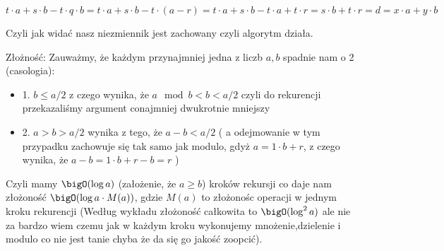 $$t \cdot a + s \cdot b - t \cdot q \cdot b = t\cdot a + s\cdot b - t\cdot(a - r) =  t\cdot a + s \cdot b - t \cdot a + t\cdot r = s \cdot b + t \cdot r = d = x\cdot a + y \cdot b$$

Czyli jak widać nasz niezmiennik jest zachowany czyli algorytm działa. \newline

Złożność:
Zauważmy, że każdym przynajmniej jedna z liczb $a,b$ spadnie nam o 2 (casologia):
\begin{itemize}
    \item 1. $b \leq a/2$ z czego wynika, że $a\mod b < b < a/2$ czyli do rekurencji przekazaliśmy argument conajmniej dwukrotnie mniejszy
    
    \item 2. $a > b > a/2$ wynika z tego, że $a - b < a/2$ ( a odejmowanie w tym przypadku zachowuje się tak samo jak modulo, gdyż $a = 1 \cdot b + r$, z czego wynika, że $a - b = 1 \cdot b + r - b = r$ )
\end{itemize}
Czyli mamy $\bigO(\log a)$ (założenie, że $a \geq b$) kroków rekursji co daje nam złożoność $\bigO(\log a \cdot M(a))$, gdzie $M(a)$ to złożonośc operacji w jednym kroku rekurencji (Według wykładu złożoność całkowita to $\bigO(\log^2 a)$ ale nie za bardzo wiem czemu jak w każdym kroku wykonujemy mnożenie,dzielenie i modulo co nie jest tanie chyba że da się go jakość zoopcić).
